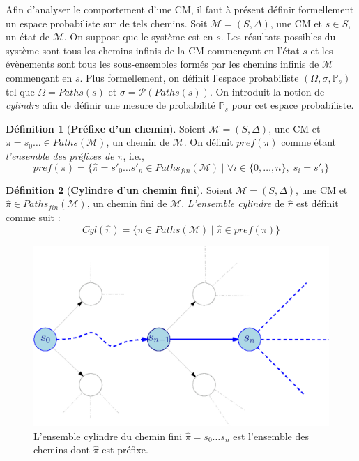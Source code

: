 \documentclass[12pt,a4paper]{report}
\theoremstyle{definition}%
\newtheorem{definition}{Définition}[chapter]
\theoremstyle{remark}
\newcommand{\ie}{i.e., }
\newcommand{\pr}{\mathbb{P}}
\begin{document}
Afin d'analyser le comportement d'une CM, il faut à présent définir formellement un
espace probabiliste sur de tels chemins. Soit $\mathcal{M} = (S, \Delta)$, une CM et
$s \in S$, un état de $\mathcal{M}$. On suppose que le système est en $s$.
Les résultats possibles du système sont tous les chemins infinis de la CM commençant
en l'état $s$ et les évènements sont tous les sous-ensembles formés par les chemins
infinis de $\mathcal{M}$ commençant en $s$. Plus formellement, on définit l'espace
probabiliste $(\Omega, \sigma, \pr_s)$ tel que $\Omega = Paths(s)$ et $\sigma =
\mathcal{P}(Paths(s))$. On introduit la notion de \textit{cylindre} afin de définir
une mesure de probabilité $\pr_s$ pour cet espace probabiliste.

\begin{definition}[\textbf{Préfixe d'un chemin}]
	Soient $\mathcal{M} = (S, \Delta)$, une CM et $\pi = s_0 \dots \in Paths(\mathcal{M})$, un chemin de $\mathcal{M}$. On définit $pref(\pi)$ comme étant \textit{l'ensemble des préfixes de $\pi$}, \ie
	\[ pref(\pi) = \{ \hat{\pi} = s'_0 \dots s'_n \in Paths_{fin}(\mathcal{M}) \; | \; \forall i \in \{0, \dots, n \}, \; s_i = s'_i \} \]
\end{definition}

\begin{definition}[\textbf{Cylindre d'un chemin fini}]
	Soient $\mathcal{M} = (S, \Delta)$, une CM et $\hat{\pi} \in Paths_{fin}(\mathcal{M})$, un chemin fini de $\mathcal{M}$.  \textit{L'ensemble cylindre} de $\hat{\pi}$ est définit comme suit :
	\[ Cyl(\hat{\pi}) = \{\pi \in Paths(\mathcal{M}) \; | \; \hat{\pi} \in pref(\pi) \}\]
\end{definition}

\begin{figure}[h]
	\centering
	\captionsetup{justification=centering}
	\includegraphics[scale=0.7]{figures/cylinder-set.eps}
	\caption{L'ensemble cylindre du chemin fini $\hat{\pi} = s_0 \dots s_n$ est {\color{blue}l'ensemble des chemins} dont $\hat{\pi}$ est préfixe.}
\end{figure}
\end{document}
